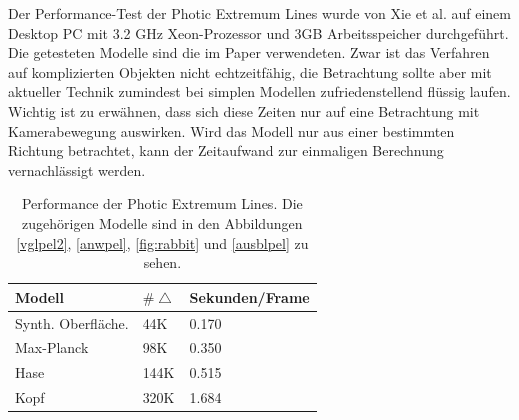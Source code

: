 \documentclass{paperStyle}
\begin{document}
Der Performance-Test der Photic Extremum Lines wurde von Xie et al. \cite{Xie2007} auf einem Desktop PC mit 3.2 GHz Xeon-Prozessor und 3GB Arbeitsspeicher durchgeführt. Die getesteten Modelle sind die im Paper verwendeten. Zwar ist das Verfahren auf komplizierten Objekten nicht echtzeitfähig, die Betrachtung sollte aber mit aktueller Technik zumindest bei simplen Modellen zufriedenstellend flüssig laufen.
Wichtig ist zu erwähnen, dass sich diese Zeiten nur auf eine Betrachtung mit Kamerabewegung auswirken. Wird das Modell nur aus einer bestimmten Richtung betrachtet, kann der Zeitaufwand zur einmaligen Berechnung vernachlässigt werden. 
\begin{table}[htb]

\begin{tabular}{|l|ll|}
\hline
Modell & $\#\bigtriangleup$ & Sekunden/Frame\\
\hline
Synth. Oberfläche. & 44K & 0.170 \\
Max-Planck & 98K & 0.350 \\
Hase & 144K & 0.515 \\
Kopf & 320K & 1.684 \\

\hline
\end{tabular}
\caption{Performance der Photic Extremum Lines. Die zugehörigen Modelle sind in den Abbildungen \ref{vglpel2}, \ref{anwpel}, \ref{fig:rabbit} und \ref{ausblpel} zu sehen.  \cite{Xie2007}} 
\label{tab:TableExample}
\end{table}
\end{document}
